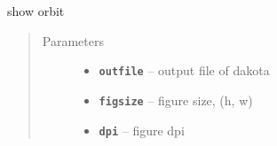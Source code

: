\documentclass[letterpaper,10pt,english]{sphinxmanual}
\begin{document}
\begin{fulllineitems}
\begin{fulllineitems}
\begin{quote}
\begin{description}
\end{description}\end{quote}

\end{fulllineitems}


\begin{fulllineitems}
\label{src/apidocs/genopt:genopt.DakotaOC.hcors}
\end{fulllineitems}


\begin{fulllineitems}
\label{src/apidocs/genopt:genopt.DakotaOC.latfile}
\end{fulllineitems}


\begin{fulllineitems}
\label{src/apidocs/genopt:genopt.DakotaOC.optdriver}
\end{fulllineitems}


\begin{fulllineitems}
\label{src/apidocs/genopt:genopt.DakotaOC.plot}
show orbit
\begin{quote}\begin{description}
\item[{Parameters}] \leavevmode\begin{itemize}
\item {} 
\textbf{\texttt{outfile}} -- output file of dakota

\item {} 
\textbf{\texttt{figsize}} -- figure size, (h, w)

\item {} 
\textbf{\texttt{dpi}} -- figure dpi

\end{itemize}

\end{description}\end{quote}

\end{fulllineitems}


\end{fulllineitems}
\end{document}
